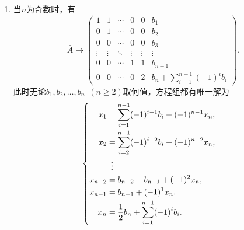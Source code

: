 \begin{enumerate}
\begin{enumerate}
              \item 当$n$为奇数时，有
                    \[ \bar{A}\rightarrow\begin{pmatrix}
                            1      & 1      & \cdots & 0      & 0      & b_1                                        \\
                            0      & 1      & \cdots & 0      & 0      & b_2                                        \\
                            0      & 0      & \cdots & 0      & 0      & b_3                                        \\
                            \vdots & \vdots & \ddots & \vdots & \vdots & \vdots                                     \\
                            0      & 0      & \cdots & 1      & 1      & b_{n-1}                                    \\
                            0      & 0      & \cdots & 0      & 2      & b_n+\displaystyle\sum_{i=1}^{n-1}(-1)^ib_i
                        \end{pmatrix}. \]
                    此时无论$b_1,b_2,\ldots,b_n\enspace(n\geqslant 2)$取何值，方程组都有唯一解为
                    \[\begin{cases} \begin{aligned}
                                x_1     & =\displaystyle\sum_{i=1}^{n-1}(-1)^{i-1}b_i+(-1)^{n-1}x_n, \\
                                x_2     & =\displaystyle\sum_{i=2}^{n-1}(-1)^{i-2}b_i+(-1)^{n-2}x_n, \\
                                        & \vdotswithin{ = }                                          \\
                                x_{n-2} & =b_{n-2}-b_{n-1}+(-1)^2x_n,                                \\
                                x_{n-1} & =b_{n-1}+(-1)^1x_n,                                        \\
                                x_n     & =\frac 12b_n+\displaystyle\sum_{i=1}^{n-1}(-1)^ib_i.
                            \end{aligned} \end{cases}\]
          \end{enumerate}


\end{enumerate}
